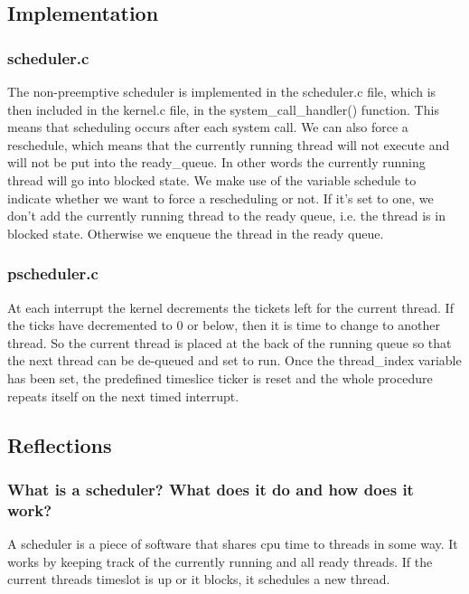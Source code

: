 \subsection{Implementation}
\subsubsection*{scheduler.c}
The non-preemptive scheduler is implemented in the scheduler.c file, which is then included in the kernel.c file, in the system\_{}call\_{}handler() function. This means that scheduling occurs after each system call. We can also force a reschedule, which means that the currently running thread will not execute and will not be put into the ready\_{}queue. In other words the currently running thread will go into blocked state.
We make use of the variable schedule to indicate whether we want to force a rescheduling or not. If it's set to one, we don't add the currently running thread to the ready queue, i.e. the thread is in blocked state. Otherwise we enqueue the thread in the ready queue.

\subsubsection*{pscheduler.c}
At each interrupt the kernel decrements the tickets left for the current thread. If the ticks have decremented to 0 or below, then it is time to change to another thread. So the current thread is placed at the back of the running queue so that the next thread can be de-queued and set to run. Once the thread\_index variable has been set, the predefined timeslice ticker is reset and the whole procedure repeats itself on the next timed interrupt.



\subsection{Reflections}

\subsubsection*{What is a scheduler? What does it do and how does it work?}
A scheduler is a piece of software that shares cpu time to threads in some way. It works by keeping track of the currently running and all ready threads. If the current threads timeslot is up or it blocks, it schedules a new thread.
